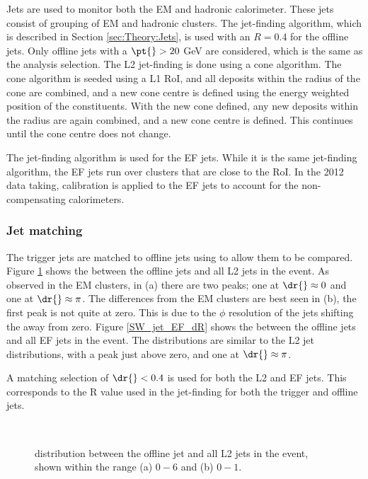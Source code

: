 Jets are used to monitor both the EM and hadronic calorimeter.
These jets consist of grouping of EM and hadronic clusters.
The \antikt{} jet-finding algorithm, which is described in Section \ref{sec:Theory:Jets}, is used with an $R=0.4$ for the offline jets.
Only offline jets with a $\pt{}>20$ GeV are considered, which is the same as the analysis selection.
The L2 jet-finding is done using a cone algorithm.
The cone algorithm is seeded using a L1 RoI, and all deposits within the radius of the cone are combined, and a new cone centre is defined using the energy weighted position of the constituents.
With the new cone defined, any new deposits within the radius are again combined, and a new cone centre is defined.
This continues until the cone centre does not change.

The \antikt{} jet-finding algorithm is used for the EF jets. 
While it is the same jet-finding algorithm, the EF jets run over clusters that are close to the RoI.
In the 2012 data taking, calibration is applied to the EF jets to account for the non-compensating calorimeters. 

\subsubsection{Jet matching}

The trigger jets are matched to offline jets using \dr{} to allow them to be compared.
Figure \ref{SW_jet_L2_dR} shows the \dr{} between the offline jets and all L2 jets in the event.
As observed in the EM clusters, in (a) there are two peaks; one at $\dr{}\approx0$ and one at $\dr{}\approx\pi$.
The differences from the EM clusters are best seen in (b), the first peak is not quite at zero.
This is due to the $\phi$ resolution of the jets shifting the \dphi{} away from zero. 
Figure \ref{SW_jet_EF_dR} shows the \dr{} between the offline jets and all EF jets in the event.
The distributions are similar to the L2 jet \dr{} distributions, with a peak just above zero, and one at $\dr{}\approx\pi$. 

A matching selection of $\dr{}<0.4$ is used for both the L2 and EF jets.
This corresponds to the R value used in the jet-finding for both the trigger and offline jets.

\begin{figure}
\centering
\mbox{
                              }
\caption[\dr{} between offline and L2 jets]{
\dr{} distribution between the offline jet and all L2 jets in the event, shown within the range (a) $0 - 6$ and (b) $0 - 1$.
\label{SW_jet_L2_dR}}
\end{figure}

